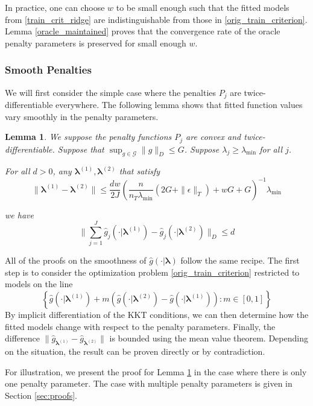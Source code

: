 \documentclass[12pt]{article}
\newtheorem{lemma}{Lemma}
\begin{document}
In practice, one can choose $w$ to be small enough such that the fitted models from \eqref{train_crit_ridge} are indistinguishable from those in \eqref{orig_train_criterion}. Lemma \ref{oracle_maintained} proves that the convergence rate of the oracle penalty parameters is preserved for small enough $w$.

\subsubsection{Smooth Penalties}
We will first consider the simple case where the penalties $P_j$ are twice-differentiable everywhere. The following lemma shows that fitted function values vary smoothly in the penalty parameters.

\begin{lemma}
\label{lemma:smooth}
We suppose the penalty functions $P_{j}$ are convex and twice-differentiable.
Suppose that $\sup_{g\in\mathcal{G}}\|g\|_{D}\le G$.
Suppose $\lambda_j \ge \lambda_{\min}$ for all $j$.

For all $d>0$, any $\boldsymbol \lambda^{(1)}, \boldsymbol \lambda^{(2)}$ that satisfy
\[
\|\boldsymbol \lambda^{(1)}- \boldsymbol \lambda^{(2)}\|\le\frac{dw}{2J}\left(\frac{n}{n_T \lambda_{\min} }\left(2G+\|\epsilon\|_{T}\right)+wG+G\right)^{-1}\lambda_{\min}
\]

we have
\[
\|\sum_{j=1}^{J}\hat{g}_{j}(\cdot| \boldsymbol \lambda^{(1)})-\hat{g}_{j}(\cdot| \boldsymbol \lambda^{(2)})\|_{D}\le d
\]
\end{lemma}

All of the proofs on the smoothness of $\hat{g}(\cdot | \boldsymbol \lambda)$ follow the same recipe. The first step is to consider the optimization problem \eqref{orig_train_criterion} restricted to models on the line
\begin{equation}
\left \{ \hat{g}(\cdot |\boldsymbol \lambda^{(1)}) + m \left (\hat{g}(\cdot |\boldsymbol \lambda^{(2)})  - \hat{g}(\cdot |\boldsymbol \lambda^{(1)}) \right ) : m \in [0,1] \right \}
\end{equation}
By implicit differentiation of the KKT conditions, we can then determine how the fitted models change with respect to the penalty parameters. Finally, the difference $\| \hat{g}_{\boldsymbol \lambda^{(1)}} -  \hat{g}_{\boldsymbol \lambda^{(2)}} \|$ is bounded using the mean value theorem. Depending on the situation, the result can be proven directly or by contradiction.

For illustration, we present the proof for Lemma \ref{lemma:smooth} in the case where there is only one penalty parameter. The case with multiple penalty parameters is given in Section \ref{sec:proofs}.
\end{document}
